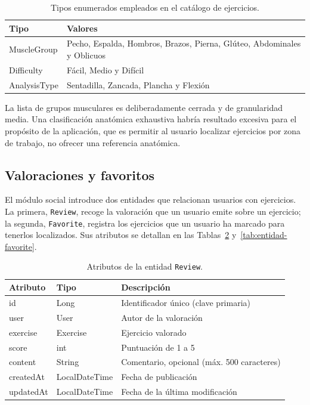 \documentclass[12pt,a4paper,twoside,openright]{book}
\begin{document}
    \begin{table}[htbp]
        \centering
        \begin{tabular}{l p{9cm}}
            \toprule
            \textbf{Tipo} & \textbf{Valores} \\
            \midrule
            MuscleGroup  & Pecho, Espalda, Hombros, Brazos, Pierna, Glúteo,
                           Abdominales y Oblicuos \\
            Difficulty   & Fácil, Medio y Difícil \\
            AnalysisType & Sentadilla, Zancada, Plancha y Flexión \\
            \bottomrule
        \end{tabular}
        \caption{Tipos enumerados empleados en el catálogo de ejercicios.}
        \label{tab:enums-catalogo}
    \end{table}

    La lista de grupos musculares es deliberadamente cerrada y de granularidad
    media. Una clasificación anatómica exhaustiva habría resultado excesiva
    para el propósito de la aplicación, que es permitir al usuario localizar
    ejercicios por zona de trabajo, no ofrecer una referencia anatómica.

    \subsection{Valoraciones y favoritos}

    El módulo social introduce dos entidades que relacionan usuarios con
    ejercicios. La primera, \texttt{Review}, recoge la valoración que un
    usuario emite sobre un ejercicio; la segunda, \texttt{Favorite}, registra
    los ejercicios que un usuario ha marcado para tenerlos localizados. Sus
    atributos se detallan en las Tablas~\ref{tab:entidad-review}
    y~\ref{tab:entidad-favorite}.

    \begin{table}[htbp]
        \centering
        \begin{tabular}{lll}
            \toprule
            \textbf{Atributo} & \textbf{Tipo} & \textbf{Descripción} \\
            \midrule
            id        & Long          & Identificador único (clave primaria) \\
            user      & User          & Autor de la valoración \\
            exercise  & Exercise      & Ejercicio valorado \\
            score     & int           & Puntuación de 1 a 5 \\
            content   & String        & Comentario, opcional (máx. 500 caracteres) \\
            createdAt & LocalDateTime & Fecha de publicación \\
            updatedAt & LocalDateTime & Fecha de la última modificación \\
            \bottomrule
        \end{tabular}
        \caption{Atributos de la entidad \texttt{Review}.}
        \label{tab:entidad-review}
    \end{table}
\end{document}
